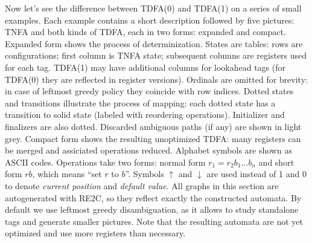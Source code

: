 \documentclass{article}
\newcommand{\Xeq}{\!=\!}
\theoremstyle{definition}
\begin{document}
\begin{multicols}{2}
Now let's see the difference between TDFA(0) and TDFA(1) on a series of small examples.
Each example contains a short description followed by five pictures:
TNFA and both kinds of TDFA, each in two forms: expanded and compact.
Expanded form shows the process of determinization.
States are tables: rows are configurations; first column is TNFA state;
subsequent columns are registers used for each tag.
TDFA(1) may have additional columns for lookahead tags (for TDFA(0) they are reflected in register versions).
Ordinals are omitted for brevity: in case of leftmost greedy policy they coincide with row indices.
Dotted states and transitions illustrate the process of mapping:
each dotted state has a transition to solid state (labeled with reordering operations).
Initializer and finalizers are also dotted.
Discarded ambiguous paths (if any) are shown in light grey.
Compact form shows the resulting unoptimized TDFA: many registers can be merged and assiciated operations reduced.
Alphabet symbols are shown as ASCII codes.
Operations take two forms: normal form $r_1 \Xeq r_2 b_1 \dots b_n$
and short form $r b$, which means ``set $r$ to $b$''.
Symbols $\uparrow$ and $\downarrow$ are used instead of 1 and 0 to denote \emph{current position} and \emph{default value}.
All graphs in this section are autogenerated with RE2C, so they reflect exactly the constructed automata.
By default we use leftmost greedy disambiguation, as it allows to study standalone tags and generate smaller pictures.
Note that the resulting automata are not yet optimized and use more registers than necessary.
\\

\end{multicols}
\end{document}
